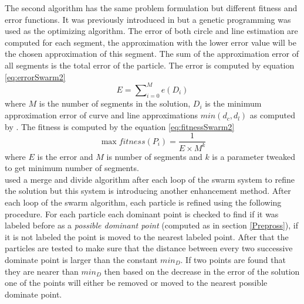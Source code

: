 \documentclass[a4paper,10pt]{IEEEconf}
\begin{document}
The second algorithm has the same problem formulation but different fitness and error functions. It was previously introduced in  \cite{CruveDivisionSwarm} but a genetic programming was used as the optimizing algorithm.  The error of both circle and line estimation are computed for each segment, the approximation with the lower error value will be the chosen approximation of this segment. The sum of the approximation error of all segments is the total error of the particle.  The error is computed by equation \ref{eq:errorSwarm2} \begin{equation}
E=\sum\nolimits_{i = 0}^M e(D_i) 
\label{eq:errorSwarm2}
\end{equation}where $M$ is the number of segments in the solution, $D_i$ is the minimum approximation error of curve and line approximations $min(d_c,d_l)$ as computed by \cite{CruveDivisionSwarm}.  The fitness is computed by the equation \ref{eq:fitnessSwarm2} \begin{equation}
\max fitness(P_i ) = \frac{1}{{E \times M^k }}
\label{eq:fitnessSwarm2}
\end{equation} where $E$ is the error and $M$ is number of segments and $k$ is a parameter tweaked to get minimum number of segments. \\
\citeauthor{PolygonApproximationPSO} \cite{PolygonApproximationPSO} used a merge and divide algorithm after each loop of the swarm system to refine the solution but this system is introducing another enhancement method. After each loop of the swarm algorithm, each particle is refined using the following procedure. For each particle %
each dominant point is checked to find if it was labeled before as a \textit{possible dominant point} (computed as in section \ref{Prepross}), if it is not labeled the point is moved to the nearest labeled point. After that the particles are tested to make sure that the distance between every two successive dominate point is larger than the constant $min_D$. If two points are found that they are nearer than $min_D$ then based on the decrease in the error of the solution one of the points will either be removed or moved to the nearest possible dominate point. 
\end{document}
